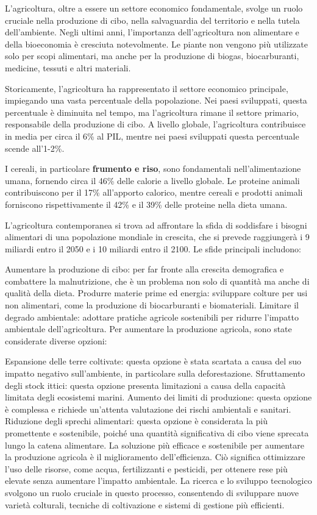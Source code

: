 \documentclass[
]{book}
\begin{document}
L'agricoltura, oltre a essere un settore economico fondamentale, svolge
un ruolo cruciale nella produzione di cibo, nella salvaguardia del
territorio e nella tutela dell'ambiente. Negli ultimi anni, l'importanza
dell'agricoltura non alimentare e della bioeconomia è cresciuta
notevolmente. Le piante non vengono più utilizzate solo per scopi
alimentari, ma anche per la produzione di biogas, biocarburanti,
medicine, tessuti e altri materiali.

Storicamente, l'agricoltura ha rappresentato il settore economico
principale, impiegando una vasta percentuale della popolazione. Nei
paesi sviluppati, questa percentuale è diminuita nel tempo, ma
l'agricoltura rimane il settore primario, responsabile della produzione
di cibo. A livello globale, l'agricoltura contribuisce in media per
circa il 6\% al PIL, mentre nei paesi sviluppati questa percentuale
scende all'1-2\%.

I cereali, in particolare \textbf{frumento e riso}, sono fondamentali
nell'alimentazione umana, fornendo circa il 46\% delle calorie a livello
globale. Le proteine animali contribuiscono per il 17\% all'apporto
calorico, mentre cereali e prodotti animali forniscono rispettivamente
il 42\% e il 39\% delle proteine nella dieta umana.

L'agricoltura contemporanea si trova ad affrontare la sfida di
soddisfare i bisogni alimentari di una popolazione mondiale in crescita,
che si prevede raggiungerà i 9 miliardi entro il 2050 e i 10 miliardi
entro il 2100. Le sfide principali includono:

Aumentare la produzione di cibo: per far fronte alla crescita
demografica e combattere la malnutrizione, che è un problema non solo di
quantità ma anche di qualità della dieta. Produrre materie prime ed
energia: sviluppare colture per usi non alimentari, come la produzione
di biocarburanti e biomateriali. Limitare il degrado ambientale:
adottare pratiche agricole sostenibili per ridurre l'impatto ambientale
dell'agricoltura. Per aumentare la produzione agricola, sono state
considerate diverse opzioni:

Espansione delle terre coltivate: questa opzione è stata scartata a
causa del suo impatto negativo sull'ambiente, in particolare sulla
deforestazione. Sfruttamento degli stock ittici: questa opzione presenta
limitazioni a causa della capacità limitata degli ecosistemi marini.
Aumento dei limiti di produzione: questa opzione è complessa e richiede
un'attenta valutazione dei rischi ambientali e sanitari. Riduzione degli
sprechi alimentari: questa opzione è considerata la più promettente e
sostenibile, poiché una quantità significativa di cibo viene sprecata
lungo la catena alimentare. La soluzione più efficace e sostenibile per
aumentare la produzione agricola è il miglioramento dell'efficienza. Ciò
significa ottimizzare l'uso delle risorse, come acqua, fertilizzanti e
pesticidi, per ottenere rese più elevate senza aumentare l'impatto
ambientale. La ricerca e lo sviluppo tecnologico svolgono un ruolo
cruciale in questo processo, consentendo di sviluppare nuove varietà
colturali, tecniche di coltivazione e sistemi di gestione più
efficienti.
\end{document}
